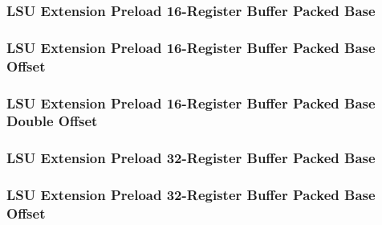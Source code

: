 

\subsubsection[{\small LSU Extension Preload 16-Register Buffer Packed Base}]{LSU Extension Preload 16-Register Buffer Packed Base} \label{sec:format-LSU-XPL16RBB}



\subsubsection[{\small LSU Extension Preload 16-Register Buffer Packed Base Offset}]{LSU Extension Preload 16-Register Buffer Packed Base Offset} \label{sec:format-LSU-XPL16RBB.O}



\subsubsection[{\small LSU Extension Preload 16-Register Buffer Packed Base Double Offset}]{LSU Extension Preload 16-Register Buffer Packed Base Double Offset} \label{sec:format-LSU-XPL16RBB.D}



\subsubsection[{\small LSU Extension Preload 32-Register Buffer Packed Base}]{LSU Extension Preload 32-Register Buffer Packed Base} \label{sec:format-LSU-XPL32RBB}



\subsubsection[{\small LSU Extension Preload 32-Register Buffer Packed Base Offset}]{LSU Extension Preload 32-Register Buffer Packed Base Offset} \label{sec:format-LSU-XPL32RBB.O}

